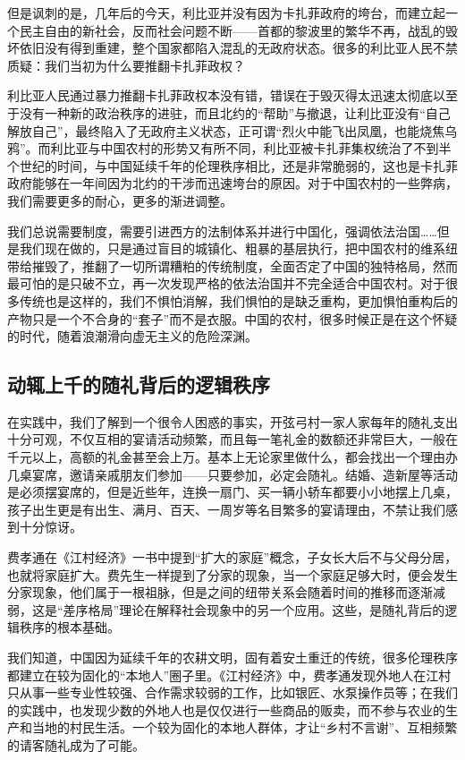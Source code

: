 \documentclass[openany,scheme = chinese, linespread = 1.5]{ctexbook}
\begin{document}
但是讽刺的是，几年后的今天，利比亚并没有因为卡扎菲政府的垮台，而建立起一个民主自由的新社会，反而社会问题不断——首都的黎波里的繁华不再，战乱的毁坏依旧没有得到重建，整个国家都陷入混乱的无政府状态。很多的利比亚人民不禁质疑：我们当初为什么要推翻卡扎菲政权？

利比亚人民通过暴力推翻卡扎菲政权本没有错，错误在于毁灭得太迅速太彻底以至于没有一种新的政治秩序的进驻，而且北约的“帮助”与撤退，让利比亚没有“自己解放自己”，最终陷入了无政府主义状态，正可谓“烈火中能飞出凤凰，也能烧焦乌鸦”。而利比亚与中国农村的形势又有所不同，利比亚被卡扎菲集权统治了不到半个世纪的时间，与中国延续千年的伦理秩序相比，还是非常脆弱的，这也是卡扎菲政府能够在一年间因为北约的干涉而迅速垮台的原因。对于中国农村的一些弊病，我们需要更多的耐心，更多的渐进调整。

我们总说需要制度，需要引进西方的法制体系并进行中国化，强调依法治国……但是我们现在做的，只是通过盲目的城镇化、粗暴的基层执行，把中国农村的维系纽带给摧毁了，推翻了一切所谓糟粕的传统制度，全面否定了中国的独特格局，然而最可怕的是只破不立，再一次发现严格的依法治国并不完全适合中国农村。对于很多传统也是这样的，我们不惧怕消解，我们惧怕的是缺乏重构，更加惧怕重构后的产物只是一个不合身的“套子”而不是衣服。中国的农村，很多时候正是在这个怀疑的时代，随着浪潮滑向虚无主义的危险深渊。

\subsection*{动辄上千的随礼背后的逻辑秩序}

在实践中，我们了解到一个很令人困惑的事实，开弦弓村一家人家每年的随礼支出十分可观，不仅互相的宴请活动频繁，而且每一笔礼金的数额还非常巨大，一般在千元以上，高额的礼金甚至会上万。基本上无论家里做什么，都会找出一个理由办几桌宴席，邀请亲戚朋友们参加——只要参加，必定会随礼。结婚、造新屋等活动是必须摆宴席的，但是近些年，连换一扇门、买一辆小轿车都要小小地摆上几桌，孩子出生更是有出生、满月、百天、一周岁等名目繁多的宴请理由，不禁让我们感到十分惊讶。

费孝通在《江村经济》一书中提到“扩大的家庭”概念，子女长大后不与父母分居，也就将家庭扩大。费先生一样提到了分家的现象，当一个家庭足够大时，便会发生分家现象，他们属于一根祖脉，但是之间的纽带关系会随着时间的推移而逐渐减弱，这是“差序格局”理论在解释社会现象中的另一个应用。这些，是随礼背后的逻辑秩序的根本基础。

我们知道，中国因为延续千年的农耕文明，固有着安土重迁的传统，很多伦理秩序都建立在较为固化的“本地人”圈子里。《江村经济》中，费孝通发现外地人在江村只从事一些专业性较强、合作需求较弱的工作，比如银匠、水泵操作员等；在我们的实践中，也发现少数的外地人也是仅仅进行一些商品的贩卖，而不参与农业的生产和当地的村民生活。一个较为固化的本地人群体，才让“乡村不言谢”、互相频繁的请客随礼成为了可能。
\end{document}
